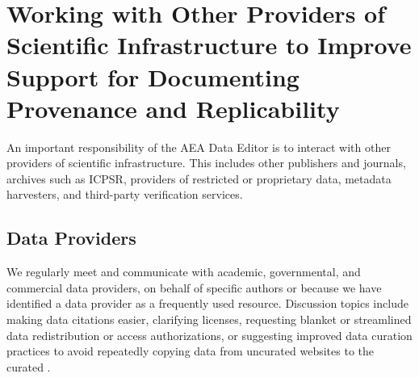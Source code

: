
\section{Working with Other Providers of Scientific Infrastructure to Improve Support for Documenting Provenance and Replicability}
\label{sec:coordination}

An important responsibility of the AEA Data Editor is to interact with other providers of scientific infrastructure. This includes other publishers and journals, archives such as ICPSR, providers of restricted or proprietary data, metadata harvesters, and third-party verification services. 






\subsection{Data Providers}
\label{sec:producers}

We regularly meet and communicate with academic, governmental, and commercial data providers, on behalf of specific authors or because we have identified a data provider as a frequently used resource. Discussion topics include making data citations easier, clarifying licenses, requesting blanket or streamlined data redistribution or access authorizations, or suggesting improved data curation practices to avoid repeatedly copying data from uncurated websites to the curated \aeadcr{}. 

